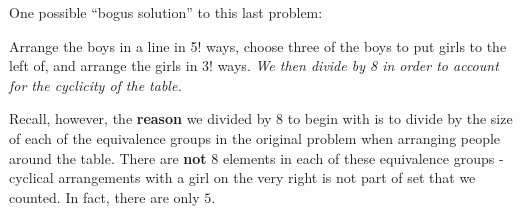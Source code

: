 \label{05-0207-1}

One possible ``bogus solution'' to this last problem:

\begin{solution}
	Arrange the boys in a line in 5! ways, choose three of the boys to put girls to the left of, and arrange the girls in 3! ways. \textit{We then divide by 8 in order to account for the cyclicity of the table.}
\end{solution}
\newline
Recall, however, the \textbf{reason} we divided by $8$ to begin with is to divide by the size of each of the equivalence groups in the original problem when arranging people around the table. There are \textbf{not} $8$ elements in each of these equivalence groups - cyclical arrangements with a girl on the very right is not part of set that we counted. In fact, there are only $5$. 

